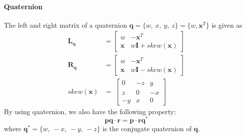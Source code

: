 \documentclass[a4paper]{report}
\begin{document}
\paragraph{Quaternion} 
The left and right matrix of a quaternion $\mathbf{q}=\{w,\ x,\ y,\ z\}=\{w, \mathbf{x}^T\}$ is given as
\begin{align*}
	\mathbf{L_{q}}&=\left[
	\begin{matrix}
	w & -\mathbf{x}^T \\
	\mathbf{x} & w\mathbf{I}+skew(\mathbf{x})
	\end{matrix}
	\right] \\
	\mathbf{R_{q}}&=\left[
	\begin{matrix}
	w & -\mathbf{x}^T \\
	\mathbf{x} & w\mathbf{I}-skew(\mathbf{x})
	\end{matrix}
	\right] \\
	skew(\mathbf{x})&=\
	\left[
	\begin{matrix}
	0 & -z & y \\
	z & 0 & -x \\
	-y & x & 0
	\end{matrix}
	\right]
\end{align*}
By using quaternion, we also have the following property:
$$
\mathbf{pq}\cdot \mathbf{r} = \mathbf{p} \cdot \mathbf{rq^*}
$$
where $\mathbf{q^*}=\{w,\ -x,\ -y,\ -z\}$ is the conjugate quaternion of $\mathbf{q}$.
\end{document}
